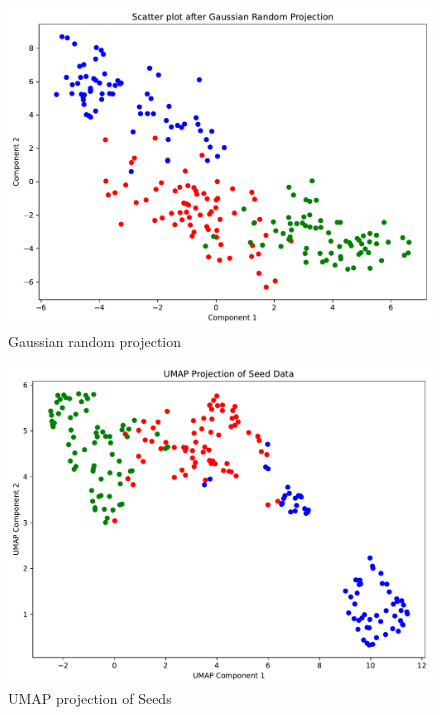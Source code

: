 \documentclass[a4paper]{article}
\begin{document}
\begin{figure}[H]
  \begin{center}
    \includegraphics[width=\textwidth]{ola/gaussian_random_projection.pdf}
    \caption{Gaussian random projection}
    \label{fig:gaussian_random_projection}
  \end{center}
\end{figure}

\begin{figure}[H]
  \begin{center}
    \includegraphics[width=\textwidth]{ola/umap.pdf}
    \caption{UMAP projection of Seeds}
    \label{fig:umap}
  \end{center}
\end{figure}
\end{document}
